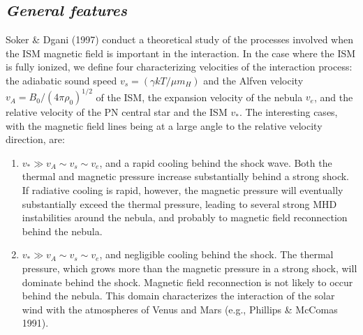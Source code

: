 \subsection{\it General features}
Soker \& Dgani (1997) conduct a theoretical study of the processes involved when
the ISM magnetic field is important in the interaction.
In the case where the ISM is fully ionized, we define four characterizing
velocities of the interaction process:
the adiabatic sound speed $v_s=(\gamma kT/\mu m_H)$ and the Alfven
velocity $v_A = B_0/(4 \pi \rho_0)^{1/2}$ of the ISM, the expansion
velocity of the nebula $v_e$, and the relative velocity of the PN
central star and the ISM $v_\ast$.
The interesting cases, with the magnetic field lines being at a large angle
to the relative velocity direction, are: \\

\begin{enumerate}
\item $v_\ast \gg v_A \sim v_s \sim v_e$, and a rapid cooling behind the
shock wave.
Both the thermal and magnetic pressure increase substantially behind
a strong shock. If radiative cooling is rapid, however, the magnetic pressure
will eventually substantially exceed the thermal pressure, leading to
several strong MHD instabilities around the nebula, and probably to
magnetic field reconnection behind the nebula.

\item $v_\ast \gg v_A \sim v_s \sim v_e$, and negligible cooling behind the
shock. The thermal pressure, which grows more than the magnetic pressure in a
strong shock, will dominate behind the shock.
 Magnetic field reconnection is not likely to occur behind the nebula.
This domain characterizes the interaction of the solar wind with
the atmospheres of Venus and Mars (e.g., Phillips \& McComas 1991).
\end{enumerate}
